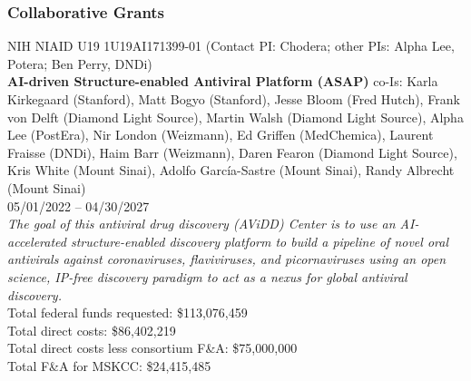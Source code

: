 \documentclass[10pt]{article}
\begin{document}




\subsubsection*{Collaborative Grants}

NIH NIAID U19 1U19AI171399-01 (Contact PI: Chodera; other PIs: Alpha Lee, Potera; Ben Perry, DNDi) \\
{\bf AI-driven Structure-enabled Antiviral Platform (ASAP)}
co-Is: Karla Kirkegaard (Stanford), Matt Bogyo (Stanford), Jesse Bloom (Fred Hutch), Frank von Delft (Diamond Light Source), Martin Walsh (Diamond Light Source), Alpha Lee (PostEra), Nir London (Weizmann), Ed Griffen (MedChemica), Laurent Fraisse (DNDi), Haim Barr (Weizmann), Daren Fearon (Diamond Light Source), Kris White (Mount Sinai), Adolfo Garc\'{i}a-Sastre (Mount Sinai), Randy Albrecht (Mount Sinai) \\
05/01/2022 -- 04/30/2027\\
\emph{The goal of this antiviral drug discovery (AViDD) Center is to use an AI-accelerated structure-enabled discovery platform to build a pipeline of novel oral antivirals against coronaviruses, flaviviruses, and picornaviruses using an open science, IP-free discovery paradigm to act as a nexus for global antiviral discovery.}\\
Total federal funds requested: \$113,076,459\\
Total direct costs: \$86,402,219\\
Total direct costs less consortium F\&A: \$75,000,000\\
Total F\&A for MSKCC: \$24,415,485\\

\end{document}
